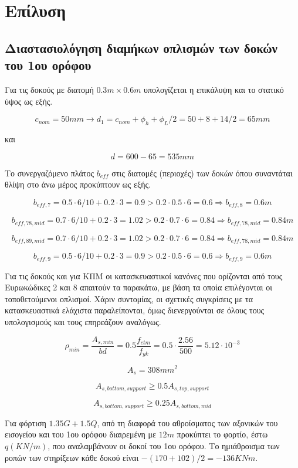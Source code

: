 \pagestyle{fancy}
\chapter{Επίλυση}
\section{Διαστασιολόγηση διαμήκων οπλισμών των δοκών του 1ου ορόφου}
\noindent
Για τις δοκούς με διατομή $0.3m\times0.6m$ υπολογίζεται η επικάλυψη και το στατικό ύψος ως εξής.

\[
c_{nom} = 50 mm \rightarrow d_1 = c_{nom} + \phi_h + \phi_L/2 = 50 + 8 + 14/2 = 65 mm
\]

\noindent
και

\[
d = 600 - 65 = 535 mm
\]

\noindent
Το συνεργαζόμενο πλάτος \(b_{eff}\) στις διατομές (περιοχές) των δοκών όπου συναντάται θλίψη στο άνω μέρος προκύπτουν ως εξής.

\[
b_{eff,7} = 0.5\cdot6/10 + 0.2\cdot3 = 0.9 > 0.2\cdot0.5\cdot6 = 0.6 \Rightarrow b_{eff,8} = 0.6m
\]

\[
b_{eff,78,mid} = 0.7\cdot6/10 + 0.2\cdot3 = 1.02 > 0.2\cdot0.7\cdot6 = 0.84 \Rightarrow b_{eff,78,mid} = 0.84m
\]

\[
b_{eff,89,mid} = 0.7\cdot6/10 + 0.2\cdot3 = 1.02 > 0.2\cdot0.7\cdot6 = 0.84 \Rightarrow b_{eff,78,mid} = 0.84m
\]

\[
b_{eff,9} = 0.5\cdot6/10 + 0.2\cdot3 = 0.9 > 0.2\cdot0.5\cdot6 = 0.6 \Rightarrow b_{eff,9} = 0.6m
\]

\noindent
Για τις δοκούς και για ΚΠΜ οι κατασκευαστικοί κανόνες που ορίζονται από τους Ευρωκώδικες 2 και 8 απαιτούν τα παρακάτω, με βάση τα οποία επιλέγονται οι τοποθετούμενοι οπλισμοί. Χάριν συντομίας, οι σχετικές συγκρίσεις με τα κατασκευαστικά ελάχιστα παραλείπονται, όμως διενεργούνται σε όλους τους υπολογισμούς και τους επηρεάζουν αναλόγως.

\[
\rho_{min} = \dfrac{A_{s,min}}{bd} = 0.5\dfrac{f_{ctm}}{f_{yk}} = 0.5\cdot \dfrac{2.56}{500} = 5.12\cdot 10^{-3}
\]

\[
A_s = 308mm^2
\]

\[
A_{s,bottom,support} \geq 0.5A_{s,top,support}
\]

\[
A_{s,bottom,support} \geq 0.25A_{s,bottom,mid}
\]

\noindent
Για φόρτιση \(1.35G + 1.5Q\), από τη διαφορά του αθροίσματος των αξονικών του εισογείου και του 1ου ορόφου διαιρεμένη με $12m$ προκύπτει το φορτίο, έστω $q (KN/m)$, που αναλαμβάνουν οι δοκοί του 1ου ορόφου. Το ημιάθροισμα των ροπών των στηρίξεων κάθε δοκού είναι $-(170+102)/2= -136KNm$.

